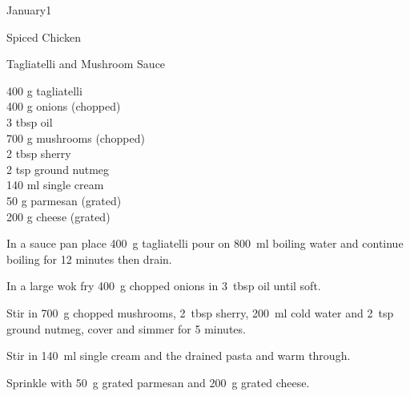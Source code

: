 \begin{menu}{January1}
\begin{recipe}{2}{Spiced Chicken}
\begin{instructions}
    \end{instructions}
    \end{recipe}%
  
    \begin{recipe}{2}{Tagliatelli and Mushroom Sauce}%
		\begin{ingredients}
		400 g tagliatelli  \\
	400 g onions (chopped) \\
	3 tbsp oil  \\
	700 g mushrooms (chopped) \\
	2 tbsp sherry  \\
	2 tsp ground nutmeg  \\
	140 ml single cream  \\
	50 g parmesan (grated) \\
	200 g cheese (grated) \\
	
		\end{ingredients}
	
	
    \begin{instructions}
    \item 
    In a
    sauce pan
    place
    400~g  tagliatelli
    pour on
    800~ml  boiling water and continue boiling for 12 minutes then drain.
  \item 
        In a large wok fry
        400~g chopped onions
        in
        3~tbsp  oil
        until soft.
      \item 
        Stir in
        700~g chopped mushrooms,
        2~tbsp  sherry,
        200~ml  cold water
        and
        2~tsp  ground nutmeg,
        cover and simmer for 5 minutes.
      \item 
        Stir in
        140~ml  single cream
        and the drained pasta
        and warm through.
      \item 
        Sprinkle with
        50~g grated parmesan
        and
        200~g grated cheese.
      
    \end{instructions}
    \end{recipe}%
  

\end{menu}
